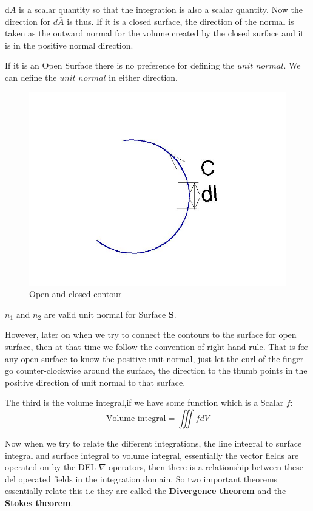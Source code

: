 d$\overline{A}$ is a scalar quantity so that the integration is also a scalar quantity. Now the direction for $d\overline{A}$ is thus. If it is a closed surface, the direction of the normal is taken as the outward normal for the volume created by the closed surface and it is in the positive normal direction.

If it is an Open Surface there is no preference for defining the $unit$ $normal$. We can define the $unit$ $normal$ in either direction.

\begin{figure}
\centering
\includegraphics[width=0.7\linewidth]{./graphics/fig174}
\caption{Open and closed contour}
\label{fig:open-and-closed-contour}
\end{figure}

$n_1$ and $n_2$ are valid unit normal for Surface \textbf{S}.

However, later on when we try to connect the contours to the surface for open surface, then at that time we follow the convention of right hand rule. That is for any open surface to know the positive unit normal, just let the curl of the finger go counter-clockwise around the surface, the direction to the thumb points in the positive direction of unit normal to that surface.

The third is the volume integral,if we have some function which is a Scalar $f$:
\begin{dmath*}
\text{Volume integral} = \iiint fdV
\end{dmath*}

Now when we try to relate the different integrations, the line integral to surface integral and surface integral to volume integral, essentially the vector fields are operated on by the DEL $\nabla$ operators, then there is a relationship between these del operated fields in the integration domain. So two important theorems essentially relate this i.e they are called the \textbf{Divergence theorem} and the \textbf{Stokes theorem}.

